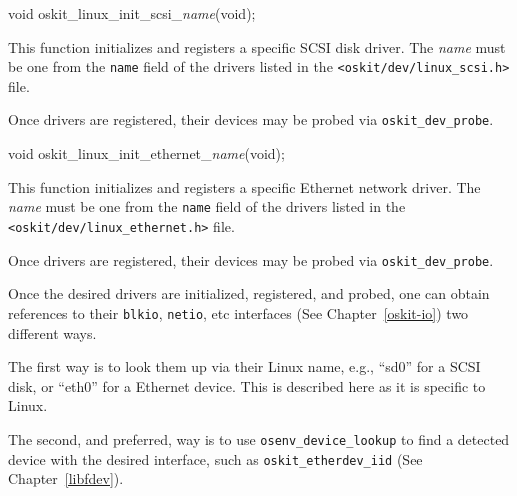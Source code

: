 \begin{apisyn}

	\funcproto void oskit_linux_init_scsi_\emph{name}(void);
\end{apisyn}
\begin{apidesc}
	This function initializes and registers a specific SCSI disk driver.
	The \emph{name} must be one from the \texttt{name} field of the drivers
	listed in the
	\texttt{<oskit/dev/linux_scsi.h>} file.

	Once drivers are registered, their devices may be probed
	via \texttt{oskit_dev_probe}.
\end{apidesc}


\begin{apisyn}

	\funcproto void oskit_linux_init_ethernet_\emph{name}(void);
\end{apisyn}
\begin{apidesc}
	This function initializes and registers a specific Ethernet
	network driver.
	The \emph{name} must be one from the \texttt{name} field of the drivers
	listed in the
	\texttt{<oskit/dev/linux_ethernet.h>} file.

	Once drivers are registered, their devices may be probed
	via \texttt{oskit_dev_probe}.
\end{apidesc}



Once the desired drivers are initialized, registered, and probed,
one can obtain references to their \texttt{blkio}, \texttt{netio}, etc
interfaces (See Chapter~\ref{oskit-io}) two different ways.

The first way is to look them up via their Linux name, e.g., ``sd0'' for
a SCSI disk, or ``eth0'' for a Ethernet device.
This is described here as it is specific to Linux.

The second, and preferred, way is to use \texttt{osenv_\-device_\-lookup}
to find a detected device with the desired interface, such as
\texttt{oskit_\-etherdev_\-iid} (See Chapter~\ref{libfdev}).



